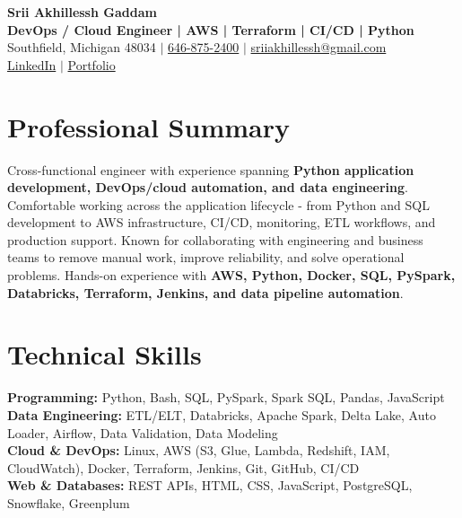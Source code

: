\documentclass[letterpaper,10pt]{article}
\begin{document}
\fontsize{9.35pt}{10.45pt}\selectfont

\begin{center}
    {\LARGE \textbf{Srii Akhillessh Gaddam}} \\[-1pt]
    \textbf{DevOps / Cloud Engineer | AWS | Terraform | CI/CD | Python} \\[2pt]
    Southfield, Michigan 48034 $|$
    \href{tel:6468752400}{646-875-2400} $|$
    \href{mailto:sriiakhillessh@gmail.com}{sriiakhillessh@gmail.com} \\[1pt]
    \href{https://www.linkedin.com/in/srii-akhiilessh-gaddam-b48668191/}{LinkedIn} $|$
    \href{https://sriiakhillesshg.github.io/portfolio/}{Portfolio}
\end{center}
\vspace{-8pt}

\section{Professional Summary}
\small{Cross-functional engineer with experience spanning \textbf{Python application development, DevOps/cloud automation, and data engineering}. Comfortable working across the application lifecycle - from Python and SQL development to AWS infrastructure, CI/CD, monitoring, ETL workflows, and production support. Known for collaborating with engineering and business teams to remove manual work, improve reliability, and solve operational problems. Hands-on experience with \textbf{AWS, Python, Docker, SQL, PySpark, Databricks, Terraform, Jenkins, and data pipeline automation}.}

\section{Technical Skills}
\small{
\textbf{Programming:} Python, Bash, SQL, PySpark, Spark SQL, Pandas, JavaScript \\
\textbf{Data Engineering:} ETL/ELT, Databricks, Apache Spark, Delta Lake, Auto Loader, Airflow, Data Validation, Data Modeling \\
\textbf{Cloud \& DevOps:} Linux, AWS (S3, Glue, Lambda, Redshift, IAM, CloudWatch), Docker, Terraform, Jenkins, Git, GitHub, CI/CD \\
\textbf{Web \& Databases:} REST APIs, HTML, CSS, JavaScript, PostgreSQL, Snowflake, Greenplum
}
\end{document}
